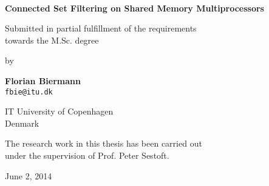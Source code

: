 \documentclass[a4paper]{report}
\begin{document}


\newpage

~ %
\thispagestyle{empty}

\newpage

\begin{titlepage}
  \begin{center}
    \vspace*{1cm}

    {\LARGE \textbf{Connected Set Filtering on Shared Memory Multiprocessors}}

    \vspace{1.5cm}

    Submitted in partial fulfillment of the requirements\\
    towards the M.Sc. degree

    \vspace{0.8cm}

    by\\

    \vspace{0.8cm}

    {\Large \textbf{Florian Biermann}}\\
    \texttt{fbie@itu.dk}

    \vfill

    IT University of Copenhagen\\
    Denmark

    \vspace{0.8cm}

    The research work in this thesis has been carried out\\
    under the supervision of Prof. Peter Sestoft.

    \vspace{1.5cm}

    June 2, 2014

  \end{center}
\end{titlepage}


\newpage

~ %
\thispagestyle{empty}

\newpage



\newpage

~ %
\thispagestyle{empty}

\newpage

\tableofcontents
\end{document}
